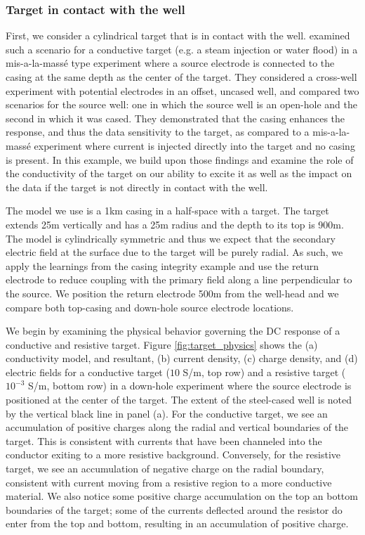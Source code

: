 \subsubsection{Target in contact with the well}
First, we consider a cylindrical target that is in contact with the well. \cite{Schenkel1994} examined such a scenario for a conductive target (e.g. a steam injection or water flood) in a mis-a-la-mass\'e type experiment where a source electrode is connected to the casing at the same depth as the center of the target. They considered a cross-well experiment with potential electrodes in an offset, uncased well, and compared two scenarios for the source well: one in which the source well is an open-hole and the second in which it was cased. They demonstrated that the casing enhances the response, and thus the data sensitivity to the target, as compared to a mis-a-la-mass\'e experiment where current is injected directly into the target and no casing is present. In this example, we build upon those findings and examine the role of the conductivity of the target on our ability to excite it as well as the impact on the data if the target is not directly in contact with the well.

The model we use is a 1km casing in a half-space with a target. The target extends 25m vertically and has a 25m radius and the depth to its top is 900m. The model is cylindrically symmetric and thus we expect that the secondary electric field at the surface due to the target will be purely radial. As such, we apply the learnings from the casing integrity example and use the return electrode to reduce coupling with the primary field along a line perpendicular to the source. We position the return electrode 500m from the well-head and we compare both top-casing and down-hole source electrode locations.

We begin by examining the physical behavior governing the DC response of a conductive and resistive target. Figure \ref{fig:target_physics} shows the (a) conductivity model, and resultant, (b) current density, (c) charge density, and (d) electric fields for a conductive target ($10$ S/m, top row) and a resistive target ($10^{-3}$ S/m, bottom row) in a down-hole experiment where the source electrode is positioned at the center of the target. The extent of the steel-cased well is noted by the vertical black line in panel (a). For the conductive target, we see an accumulation of positive charges along the radial and vertical boundaries of the target. This is consistent with currents that have been channeled into the conductor exiting to a more resistive background. Conversely, for the resistive target, we see an accumulation of negative charge on the radial boundary, consistent with current moving from a resistive region to a more conductive material. We also notice some positive charge accumulation on the top an bottom boundaries of the target; some of the currents deflected around the resistor do enter from the top and bottom, resulting in an accumulation of positive charge.

